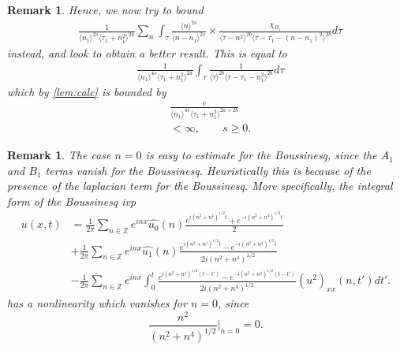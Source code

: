 \documentclass[12pt,reqno]{amsart}
\numberwithin{equation}{section}  %
\newcommand{\zz}{\mathbb{Z}}
\newcommand{\wh}{\widehat}
\newtheorem{remark}[theorem]{Remark}
\begin{document}
\begin{framed}
\begin{remark}
%
%
%
Hence, we now try to bound
\begin{equation}
\begin{split}
  & \frac{1}{\langle n_{1} \rangle ^{2s}
  \langle \tau_{1} + n_{1}^{2} \rangle
  ^{2a}} \sum_{n } \int_{\tau} \frac{\langle n \rangle ^{2s}}{\langle
  n - n_{1}\rangle ^{2s}}  \times \frac{\chi_{B_{1}}}{\langle
  \tau - n^{2}  \rangle^{2b}  \langle \tau - \tau_{1} - (n - n_{1})^{2}
  \rangle^{2b} } d \tau 
\end{split}
\end{equation}
instead, and look to obtain a better result. This is equal to 
%
\begin{equation*}
\begin{split}
  & \frac{1}{\langle n_{1} \rangle ^{4s}
  \langle \tau_{1} + n_{1}^{2} \rangle
  ^{2a}} \int_{\tau} \frac{1}{\langle
  \tau  \rangle^{2b}  \langle \tau - \tau_{1} - n_{1}^{2}
  \rangle^{2b} } d \tau
\end{split}
\end{equation*}
%
%
which by \cref{lem:calc} is bounded by
%
%
\begin{equation*}
\begin{split}
  & \frac{c}{\langle n_{1} \rangle ^{4s}
  \langle \tau_{1} + n_{1}^{2} \rangle
  ^{2a + 2b}}
\\
& < \infty, \qquad s \ge 0. 
\end{split}
\end{equation*}
%
\end{remark}
\end{framed}
%
%
\begin{framed}
\begin{remark}
The case $n=0$ is easy to estimate for the Boussinesq, since the
$A_{1}$ and $B_{1}$ terms vanish for the Boussinesq. Heuristically this is
because of the presence of the laplacian term for the Boussinesq. More
specifically, the integral form of the Boussinesq ivp
\begin{equation*}
  \begin{split}
    u(x,t)
    & = \frac{1}{2\pi}\sum_{n \in \zz} e^{inx} \wh{u_{0}}(n) \frac{e^{i(n^{2} + n^{4})^{1/2}t} + e^{-i(n^{2} + n^{4})^{1/2}t}}{2} 
    \\
    & + \frac{1}{2 \pi}\sum_{n \in \zz} e^{inx}
    \wh{u_{1}}(n)\frac{e^{i(n^{2} + n^{4})^{1/2}t} - e^{-i(n^{2} + n^{4})^{1/2}t}}{2 i (n^{2} +
    n^{4})^{1/2}} 
    \\
    & - \frac{1}{2 \pi}\sum_{n \in \zz} e^{inx}
    \int_{0}^{t}\frac{e^{i(n^{2} + n^{4})^{1/2}(t-t')}-e^{-i(n^{2} + n^{4})^{1/2}(t-t')}}{2 i (n^{2} +
    n^{4})^{1/2}}
    \wh{(u^{2})_{xx}}(n, t') dt'.
  \end{split}
\end{equation*}
has a nonlinearity which vanishes for $n =0$, since 
$$\frac{n^{2}}{(n^{2} + n^{4})^{1/2}} |_{n=0} = 0.$$ 
\label{rem:bous-easier}
\end{remark}
\end{framed}
\end{document}

